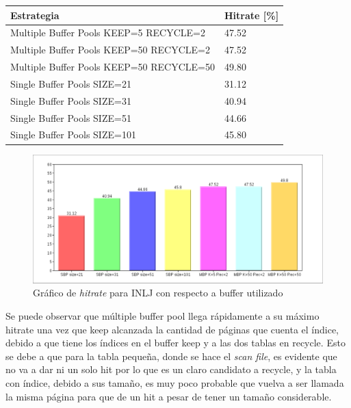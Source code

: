 \begin{table}[H]
        \begin{tabular}{l||l}
    \large{\textbf{Estrategia}}                             & \large{\textbf{Hitrate}} [\%] \\
    \hline
                Multiple Buffer Pools KEEP=5 RECYCLE=2		&	47.52	\\
                Multiple Buffer Pools KEEP=50 RECYCLE=2		&	47.52	\\
                Multiple Buffer Pools KEEP=50 RECYCLE=50 	&	49.80	\\
                Single Buffer Pools SIZE=21             	&	31.12	\\
                Single Buffer Pools SIZE=31             	&	40.94	\\
                Single Buffer Pools SIZE=51             	&	44.66	\\
                Single Buffer Pools SIZE=101            	&	45.80	\\
                \end{tabular}
            \end{table}
\begin{figure}[H]\centering
    \includegraphics[scale=0.4]{INLJ.pdf}
    \caption{Gráfico de \textit{hitrate} para INLJ con respecto a buffer utilizado}
    \label{grafiquito3}
\end{figure}

Se puede observar que múltiple buffer pool llega rápidamente a su máximo hitrate una vez que keep alcanzada
la cantidad de páginas que cuenta el índice, debido a que tiene los índices en el buffer keep 
y a las dos tablas en recycle. Esto se debe a que para la tabla peque\~{n}a, donde se hace el \textit{scan file}, 
es evidente que no va a dar ni un solo hit por lo que es un claro candidato a recycle, y la tabla con índice,
debido a sus tama\~{n}o, es muy poco probable que vuelva a ser llamada la misma página para que de un hit 
a pesar de tener un tama\~{n}o considerable.

